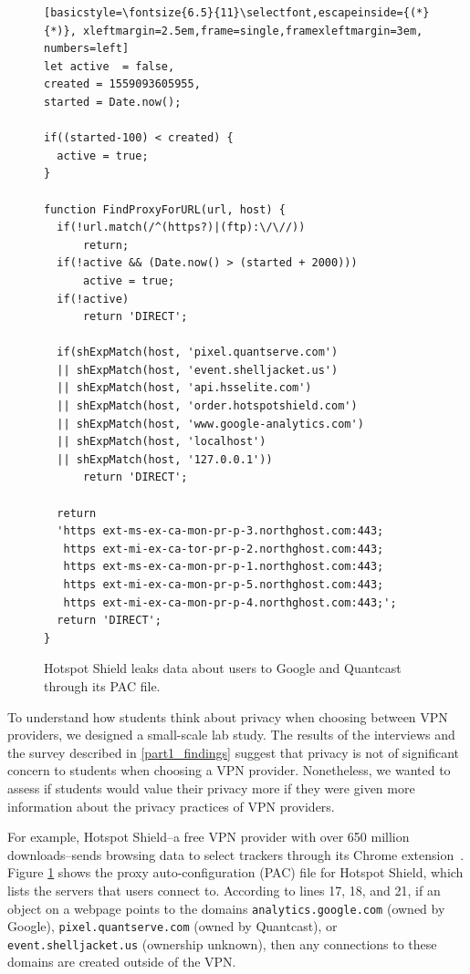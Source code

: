 
\begin{figure}[t]
    \begin{lstlisting}[basicstyle=\fontsize{6.5}{11}\selectfont,escapeinside={(*}{*)}, xleftmargin=2.5em,frame=single,framexleftmargin=3em, numbers=left]
let active  = false,
created = 1559093605955,
started = Date.now();

if((started-100) < created) {
  active = true;
}

function FindProxyForURL(url, host) {
  if(!url.match(/^(https?)|(ftp):\/\//)) 
      return;
  if(!active && (Date.now() > (started + 2000))) 
      active = true;
  if(!active) 
      return 'DIRECT';

  if(shExpMatch(host, 'pixel.quantserve.com')
  || shExpMatch(host, 'event.shelljacket.us')
  || shExpMatch(host, 'api.hsselite.com') 
  || shExpMatch(host, 'order.hotspotshield.com') 
  || shExpMatch(host, 'www.google-analytics.com')
  || shExpMatch(host, 'localhost') 
  || shExpMatch(host, '127.0.0.1')) 
      return 'DIRECT';

  return 
  'https ext-ms-ex-ca-mon-pr-p-3.northghost.com:443;
   https ext-mi-ex-ca-tor-pr-p-2.northghost.com:443;
   https ext-ms-ex-ca-mon-pr-p-1.northghost.com:443;
   https ext-mi-ex-ca-mon-pr-p-5.northghost.com:443;
   https ext-mi-ex-ca-mon-pr-p-4.northghost.com:443;';
  return 'DIRECT';
}
    \end{lstlisting}
\caption{Hotspot Shield leaks data about users to Google and Quantcast through its PAC file.}
\label{fig:hotspot_pac}
\end{figure}

To understand how students think about privacy when choosing between VPN
providers, we designed a small-scale lab study.  The results of the interviews
and the survey described in \ref{part1_findings} suggest that privacy is not of
significant concern to students when choosing a VPN provider.
Nonetheless, we wanted to assess if students would value their privacy more if
they were given more information about the privacy practices of VPN providers.

For example, Hotspot Shield--a free VPN provider with over 650 million downloads--sends browsing data to select trackers through its Chrome extension~\cite{hotspot_shield, windscribe_hotspot}. Figure \ref{fig:hotspot_pac} shows the proxy auto-configuration (PAC) file for Hotspot Shield, which lists the servers that users connect to. According to lines 17, 18, and 21, if an object on a webpage points to the domains \texttt{analytics.google.com} (owned by Google), \texttt{pixel.quantserve.com} (owned by Quantcast), or \texttt{event.shelljacket.us} (ownership unknown), then any connections to these domains are created outside of the VPN. 

